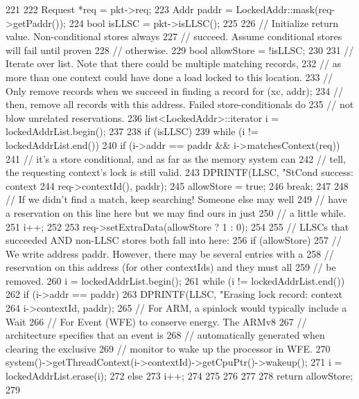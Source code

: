 \begin{DoxyCode}
221 {
222     Request *req = pkt->req;
223     Addr paddr = LockedAddr::mask(req->getPaddr());
224     bool isLLSC = pkt->isLLSC();
225 
226     // Initialize return value.  Non-conditional stores always
227     // succeed.  Assume conditional stores will fail until proven
228     // otherwise.
229     bool allowStore = !isLLSC;
230 
231     // Iterate over list.  Note that there could be multiple matching records,
232     // as more than one context could have done a load locked to this location.
233     // Only remove records when we succeed in finding a record for (xc, addr);
234     // then, remove all records with this address.  Failed store-conditionals do
235     // not blow unrelated reservations.
236     list<LockedAddr>::iterator i = lockedAddrList.begin();
237 
238     if (isLLSC) {
239         while (i != lockedAddrList.end()) {
240             if (i->addr == paddr && i->matchesContext(req)) {
241                 // it's a store conditional, and as far as the memory system can
242                 // tell, the requesting context's lock is still valid.
243                 DPRINTF(LLSC, "StCond success: context %
244                         req->contextId(), paddr);
245                 allowStore = true;
246                 break;
247             }
248             // If we didn't find a match, keep searching!  Someone else may well
249             // have a reservation on this line here but we may find ours in just
250             // a little while.
251             i++;
252         }
253         req->setExtraData(allowStore ? 1 : 0);
254     }
255     // LLSCs that succeeded AND non-LLSC stores both fall into here:
256     if (allowStore) {
257         // We write address paddr.  However, there may be several entries with a
258         // reservation on this address (for other contextIds) and they must all
259         // be removed.
260         i = lockedAddrList.begin();
261         while (i != lockedAddrList.end()) {
262             if (i->addr == paddr) {
263                 DPRINTF(LLSC, "Erasing lock record: context %
264                         i->contextId, paddr);
265                 // For ARM, a spinlock would typically include a Wait
266                 // For Event (WFE) to conserve energy. The ARMv8
267                 // architecture specifies that an event is
268                 // automatically generated when clearing the exclusive
269                 // monitor to wake up the processor in WFE.
270                 system()->getThreadContext(i->contextId)->getCpuPtr()->wakeup();
271                 i = lockedAddrList.erase(i);
272             } else {
273                 i++;
274             }
275         }
276     }
277 
278     return allowStore;
279 }
\end{DoxyCode}
